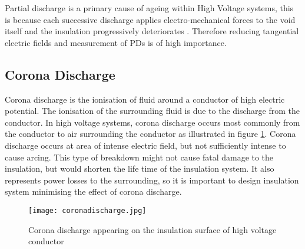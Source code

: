 Partial discharge is a primary cause of ageing within High Voltage systems, this is because each successive discharge applies electro-mechanical forces to the void itself and the insulation progressively deteriorates \cite{PDageing}. Therefore reducing tangential electric fields and measurement of PDs is of high importance. 

\subsection{Corona Discharge}
Corona discharge is the ionisation of fluid around a conductor of high electric potential. The ionisation of the surrounding fluid is due to the discharge from the conductor. In high voltage systems, corona discharge occurs most commonly from the conductor to air surrounding the conductor as illustrated in figure \ref{figure:corona}. Corona discharge occurs at area of intense electric field, but not sufficiently intense to cause arcing. This type of breakdown might not cause fatal damage to the insulation, but would shorten the life time of the insulation system. It also represents power losses to the surrounding, so it is important to design insulation system minimising the effect of corona discharge.

\begin{figure}[!h]
   \centering
   \texttt{[image: coronadischarge.jpg]}
   \caption{Corona discharge appearing on the insulation surface of high voltage conductor}
   \label{figure:corona}
\end{figure}
